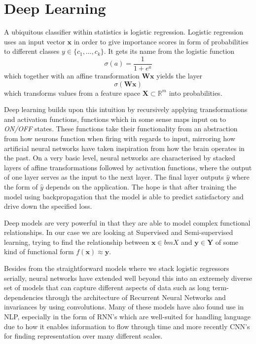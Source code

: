 \section{Deep Learning}
A ubiquitous classifier within statistics is logistic regression. Logistic
regression uses an input vector $\bm{x}$ in order to give importance scores in
form of probabilities to different classes $y \in \{c_1, \dots, c_k\}$. It gets
its name from the logistic function
\begin{equation}
  \label{eq:logistic_function}
  \sigma(a) = \frac{1}{1 + e^{a}}
\end{equation}
which together with an affine transformation $\bm{W} \bm{x}$ yields the layer
\begin{equation*}
  \sigma(\bm{W} \bm{x})
\end{equation*}
which transforms values from a feature space $\bm{X} \subset \mathbb{R}^m$ into
probabilities\cite{Bishop:2006}.

Deep learning builds upon this intuition by recursively applying transformations
and activation functions, functions which in some sense maps input on to
\textit{ON/OFF} states. These functions take their functionality from an
abstraction from how neurons function when firing with regards to input,
mirroring how artificial neural networks have taken inspiration from how the
brain operates in the past. On a very basic level, neural networks are
characterised by stacked layers of affine transformations followed by activation
functions, where the output of one layer serves as the input to the next layer.
The final layer outputs $\hat{y}$ where the form of $\hat{y}$ depends on the application.
The hope is that after training the model using
backpropagation\cite{Rumelhart:1995:BBT:201784.201785} that the model is able to
predict satisfactory and drive down the specified loss.

Deep models are very powerful in that they are able to model complex functional
relationships. In our case we are looking at Supervised and Semi-supervised
learning, trying to find the relationship between $\bm{x} \in bm{X}$ and $\bm{y}
\in \bm{Y}$ of some kind of functional form $f(\bm{x}) \approx \bm{y}$.

Besides from the straightforward models where we stack logistic regressors
serially, neural networks have extended well beyond this into an extremely
diverse set of models that can capture different aspects of data such as long
term-dependencies through the architecture of Recurrent Neural Networks and
invariances by using convolutions. Many of these models have also found use in
NLP, especially in the form of RNN's which are well-suited for handling
language due to how it enables information to flow through
time\cite{graves_generating_2013}\cite{cho_learning_2014} and more recently
CNN's for finding representation over many different
scales\cite{semeniuta_hybrid_2017}\cite{yang_improved_2017}\cite{gehring_convolutional_2016}.

